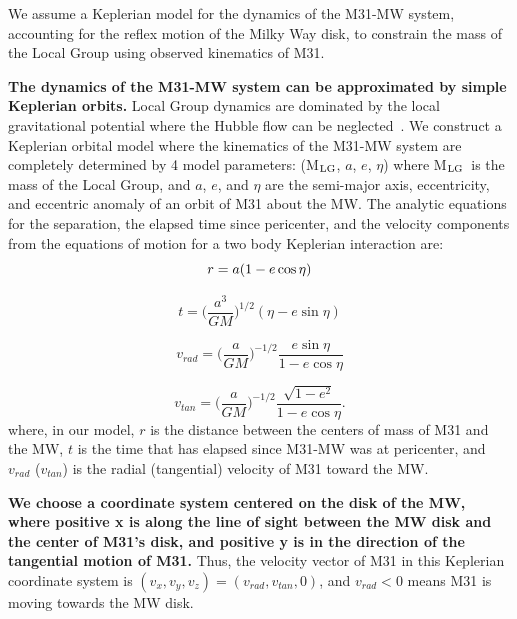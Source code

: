 \documentclass[twocolumn]{aastex631}
\newcommand{\mlg}{M$_{\rm LG}$}
\begin{document}
We assume a Keplerian model for the dynamics of the M31-MW system, accounting for the reflex motion of the Milky Way disk, to constrain the mass of the Local Group using observed kinematics of M31.  

\textbf{The dynamics of the M31-MW system can be approximated by simple Keplerian orbits.}
Local Group dynamics are dominated by the local gravitational potential where the Hubble flow can be neglected~\cite{}. We construct a Keplerian orbital model where the kinematics of the M31-MW system are completely determined by 4 model parameters: (\mlg, $a$, $e$, $\eta$) where \mlg\ is the mass of the Local Group, and $a$, $e$, and $\eta$ are the semi-major axis, eccentricity, and eccentric anomaly of an orbit of M31 about the MW. The analytic equations for the separation, the elapsed time since pericenter, and the velocity components from the equations of motion for a two body Keplerian interaction are:
\begin{equation}\label{eq:r}
  r = a(1-e\cos\eta)\\
\end{equation}

\begin{equation}\label{eq:t}
  t=\bigg(\frac{a^3}{GM}\bigg)^{1/2}(\eta-e\sin\eta)
\end{equation}

\begin{equation}\label{eq:vrad}
  v_{rad} = \bigg( \frac{a}{GM} \bigg)^{-1/2} \frac{e\sin\eta}{1-e\cos\eta}
\end{equation}

\begin{equation}\label{eq:vtan}
  v_{tan}= \bigg( \frac{a}{GM} \bigg)^{-1/2} \frac{\sqrt{1-e^2}}{1-e\cos\eta}.
\end{equation}
where, in our model, $r$ is the distance between the centers of mass of M31 and the MW, $t$ is the time that has elapsed since M31-MW was at pericenter, and $v_{rad}$ ($v_{tan}$) is the radial (tangential) velocity of M31 toward the MW. 

\textbf{We choose a coordinate system centered on the disk of the MW, where positive x is along the line of sight between the MW disk and the center of M31's disk, and positive y is in the direction of the tangential motion of M31.} Thus, the velocity vector of M31 in this Keplerian coordinate system is $(v_x, v_y, v_z) =(v_{rad},v_{tan},0)$, and $v_{rad}<0$ means M31 is moving towards the MW disk. 
\end{document}
